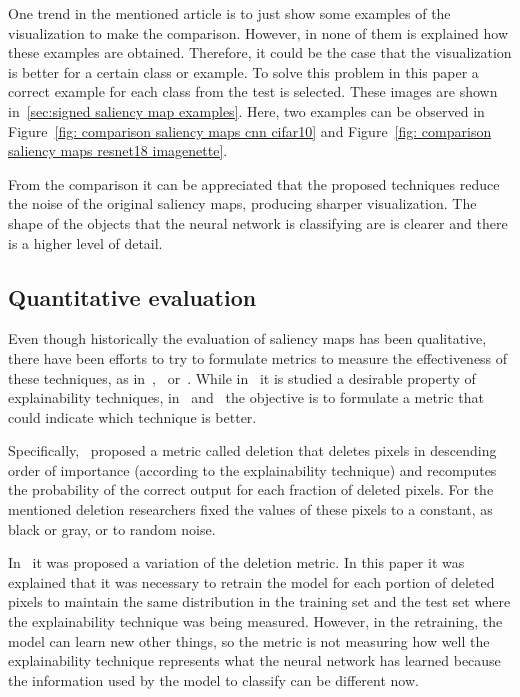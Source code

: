 \documentclass[preprint,12pt]{elsarticle}
\begin{document}
One trend in the mentioned article is to just show some examples of the visualization to make the comparison. However, in none of them is explained how these examples are obtained. Therefore, it could be the case that the visualization is better for a certain class or example. To solve this problem in this paper a correct example for each class from the test is selected. These images are shown in~\ref{sec:signed saliency map examples}. Here, two examples can be observed in Figure~\ref{fig: comparison saliency maps cnn cifar10} and Figure~\ref{fig: comparison saliency maps resnet18 imagenette}.

From the comparison it can be appreciated that the proposed techniques reduce the noise of the original saliency maps, producing sharper visualization. The shape of the objects that the neural network is classifying are is clearer and there is a higher level of detail.

\subsection{Quantitative evaluation}

Even though historically the evaluation of saliency maps has been qualitative, there have been efforts to try to formulate metrics to measure the effectiveness of these techniques, as in~\cite{petsiukRISERandomizedInput},~\cite{hookerBenchmarkInterpretabilityMethods2019} or~\cite{anconaBetterUnderstandingGradientbased2018}. While in~\cite{anconaBetterUnderstandingGradientbased2018} it is studied a desirable property of explainability techniques, in~\cite{petsiukRISERandomizedInput} and~\cite{hookerBenchmarkInterpretabilityMethods2019} the objective is to formulate a metric that could indicate which technique is better. 

Specifically,~\cite{petsiukRISERandomizedInput} proposed a metric called deletion that deletes pixels in descending order of importance (according to the explainability technique) and recomputes the probability of the correct output for each fraction of deleted pixels. For the mentioned deletion researchers fixed the values of these pixels to a constant, as black or gray, or to random noise. 

In~\cite{hookerBenchmarkInterpretabilityMethods2019} it was proposed a variation of the deletion metric. In this paper it was explained that it was necessary to retrain the model for each portion of deleted pixels to maintain the same distribution in the training set and the test set where the explainability technique was being measured. However, in the retraining, the model can learn new other things, so the metric is not measuring how well the explainability technique represents what the neural network has learned because the information used by the model to classify can be different now.
\end{document}
